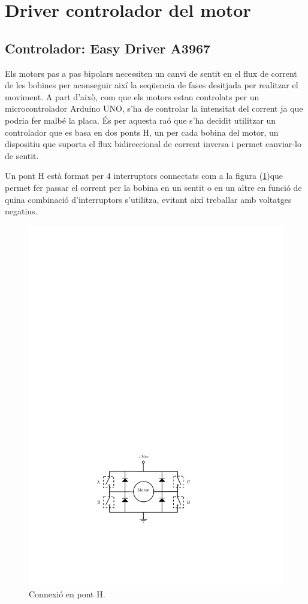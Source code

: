 \section {Driver controlador del motor}\label{sec:driver}

\subsection{Controlador: Easy Driver A3967}

Els motors pas a pas bipolars necessiten un canvi de sentit en el flux de corrent  de les bobines per aconseguir així la seqüencia de fases desitjada per realitzar el moviment. A part d'això, com que els motors estan controlats per un microcontrolador Arduino UNO, s'ha de controlar la intensitat del corrent ja que podria fer malbé la placa. És per aquesta raó que s'ha decidit utilitzar un controlador que es basa en dos ponts H, un per cada bobina del motor, un dispositiu que suporta el flux bidireccional de corrent inversa i permet  canviar-lo de sentit.


Un pont H està format per 4 interruptors connectats com a la figura (\ref{fig:ponth})que permet fer passar el corrent per la bobina en un sentit o en un altre en funció de quina combinació d'interruptors s'utilitza, evitant així treballar amb voltatges negatius.

\begin{figure}[H]
	\centering
	\includegraphics{PontH}
	\caption{Connexió en pont H.}
	\label{fig:ponth}
\end{figure}

